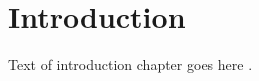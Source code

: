 \chapter{Introduction}
\label{chap:introduction}

Text of introduction chapter goes here \cite{bibtex_key}.